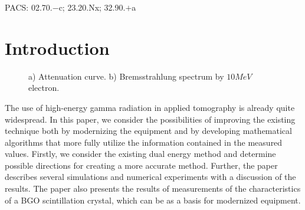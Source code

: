 \documentclass[a4paper]{panl}
\begin{document}
\noindent
PACS: 02.70.$-$c; 23.20.Nx; 32.90.$+$a

\newpage
\label{sec:intro}
\section*{Introduction}
\begin{figure}[t]
    \begin{center}
        \begin{minipage}[h]{0.49\linewidth}
        \end{minipage}
    \hfill
        \begin{minipage}[h]{0.49\linewidth}
        \end{minipage} 
        \vspace{-3mm}
        \caption{a) Attenuation curve. b) Bremsstrahlung spectrum by $10 MeV$ electron.}
    \end{center}
    \vspace{-5mm}
\end{figure}
The use of high-energy gamma radiation in applied tomography is already quite widespread. In this paper, we consider the possibilities of improving the existing technique both by modernizing the equipment and by developing mathematical algorithms that more fully utilize the information contained in the measured values. Firstly, we consider the existing dual energy method and determine possible directions for creating a more accurate method. Further, the paper describes several simulations and numerical experiments with a discussion of the results. The paper also presents the results of measurements of the characteristics of a BGO scintillation crystal, which can be as a basis for modernized equipment.
\end{document}
